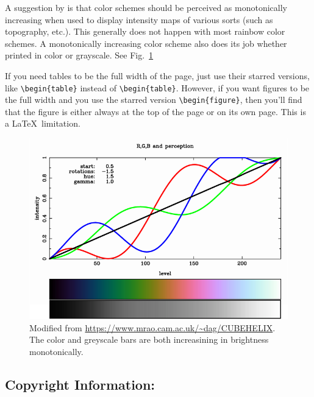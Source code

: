 \documentclass[twoside]{article}
\begin{document}
A suggestion by \citep{green2011colour} is that color schemes should be perceived as monotonically increasing when used to display intensity maps of various sorts (such as topography, etc.). 
This generally does not happen with most rainbow color schemes.
A monotonically increasing color scheme also does its job whether printed in color or grayscale.
See Fig.~\ref{SaturationColors}

If you need tables to be the full width of the page, just use their starred versions, like \verb=\begin{table}= instead of \verb=\begin{table}=. 
However, if you want figures to be the full width and you use the starred version \verb=\begin{figure}=, then you'll find that the figure is either always at the top of the page or on its own page.
This is a \LaTeX\ limitation.

\begin{figure}
\begin{center}
\includegraphics[width=\textwidth]{rgb-grey-morehue.png}
\caption[CubeHelix Color Schemes]{
   \label{SaturationColors}
    Modified from \url{https://www.mrao.cam.ac.uk/~dag/CUBEHELIX}. 
    The color and greyscale bars are both increasining in brightness monotonically.
    }
\end{center}
\end{figure}

\subsection*{\hspace{0.5cm}Copyright Information:}
\end{document}
